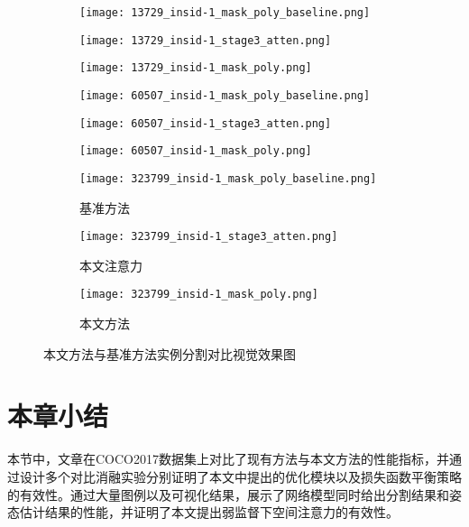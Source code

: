 \begin{figure}[H]
	\begin{minipage}{\linewidth}
		\centering
		\begin{subfigure}[b]{0.3\linewidth}
			\texttt{[image: 13729\_insid-1\_mask\_poly\_baseline.png]}
		\end{subfigure}
		\begin{subfigure}[b]{0.3\linewidth}
			\texttt{[image: 13729\_insid-1\_stage3\_atten.png]}
		\end{subfigure}
		\begin{subfigure}[b]{0.3\linewidth}
			\texttt{[image: 13729\_insid-1\_mask\_poly.png]}
		\end{subfigure}

		\vskip5pt
		\begin{subfigure}[b]{0.3\linewidth}
			{\texttt{[image: 60507\_insid-1\_mask\_poly\_baseline.png]}}
		\end{subfigure}
		\begin{subfigure}[b]{0.3\linewidth}
			{\texttt{[image: 60507\_insid-1\_stage3\_atten.png]}}
		\end{subfigure}
		\begin{subfigure}[b]{0.3\linewidth}
			{\texttt{[image: 60507\_insid-1\_mask\_poly.png]}}
		\end{subfigure}

		\vskip5pt
		\begin{subfigure}[b]{0.3\linewidth}
			\texttt{[image: 323799\_insid-1\_mask\_poly\_baseline.png]}
			\caption{基准方法\cite{He2017Mask}}
		\end{subfigure}
		\begin{subfigure}[b]{0.3\linewidth}
			\texttt{[image: 323799\_insid-1\_stage3\_atten.png]}
			\caption{本文注意力}
		\end{subfigure}
		\begin{subfigure}[b]{0.3\linewidth}
			\texttt{[image: 323799\_insid-1\_mask\_poly.png]}
			\caption{本文方法}
		\end{subfigure}
	\end{minipage}
	\caption{本文方法与基准方法实例分割对比视觉效果图}
	\label{fig:comparison_mask}
\end{figure}


\section{本章小结}
本节中，文章在COCO2017数据集上对比了现有方法与本文方法的性能指标，并通过设计多个对比消融实验分别证明了本文中提出的优化模块以及损失函数平衡策略的有效性。通过大量图例以及可视化结果，展示了网络模型同时给出分割结果和姿态估计结果的性能，并证明了本文提出弱监督下空间注意力的有效性。